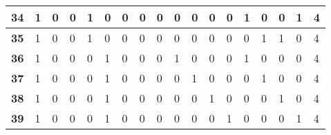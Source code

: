 \begin{table}[]
{\begin{tabular}{|P{0.6cm}|P{0.65cm}|P{0.65cm}|P{0.65cm}|P{0.65cm}|P{0.65cm}|P{0.65cm}|P{0.65cm}|P{0.65cm}|P{0.65cm}|P{0.65cm}|P{0.65cm}|P{0.65cm}|P{0.65cm}|P{0.65cm}|P{0.65cm}|P{0.65cm}|P{2.9cm}|}
\textbf{34}                        & 1                     & 0                     & 0                     & 1                     & 0                     & 0                     & 0                     & 0                     & 0                     & 0                     & 0                     & 0                     & 1                     & 0                     & 0                     & 1                     & 4                     \\ \hline
\textbf{35}                        & 1                     & 0                     & 0                     & 1                     & 0                     & 0                     & 0                     & 0                     & 0                     & 0                     & 0                     & 0                     & 0                     & 1                     & 1                     & 0                     & 4                     \\ \hline
\textbf{36}                        & 1                     & 0                     & 0                     & 0                     & 1                     & 0                     & 0                     & 0                     & 1                     & 0                     & 0                     & 0                     & 1                     & 0                     & 0                     & 0                     & 4                     \\ \hline
\textbf{37}                        & 1                     & 0                     & 0                     & 0                     & 1                     & 0                     & 0                     & 0                     & 0                     & 1                     & 0                     & 0                     & 0                     & 1                     & 0                     & 0                     & 4                     \\ \hline
\textbf{38}                        & 1                     & 0                     & 0                     & 0                     & 1                     & 0                     & 0                     & 0                     & 0                     & 0                     & 1                     & 0                     & 0                     & 0                     & 1                     & 0                     & 4                     \\ \hline
\textbf{39}                        & 1                     & 0                     & 0                     & 0                     & 1                     & 0                     & 0                     & 0                     & 0                     & 0                     & 0                     & 1                     & 0                     & 0                     & 0                     & 1                     & 4                     \\ \hline

\end{tabular}}
\end{table}
